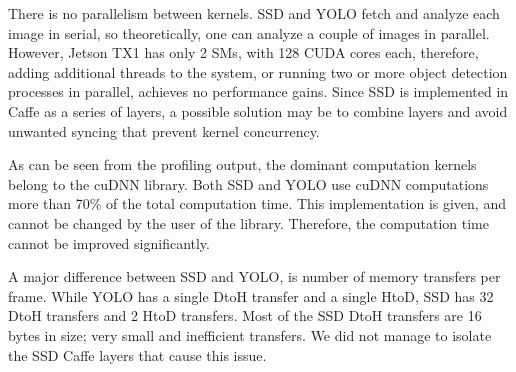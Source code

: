 There is no parallelism between kernels. SSD and YOLO fetch and analyze each image in serial, so theoretically, one can analyze a couple of images in parallel. However, Jetson TX1 has only 2 SMs, with 128 CUDA cores each, therefore, adding additional threads to the system, or running two or more object detection processes in parallel, achieves no performance gains. Since SSD is implemented in Caffe as a series of layers, a possible solution may be to combine layers and avoid unwanted syncing that prevent kernel concurrency.

As can be seen from the profiling output, the dominant computation kernels belong to the cuDNN library. Both SSD and YOLO use cuDNN computations more than 70\% of the total computation time. This implementation is given, and cannot be changed by the user of the library. Therefore, the computation time cannot be improved significantly.

A major difference between SSD and YOLO, is number of memory transfers per frame. While YOLO has a single DtoH transfer and a single HtoD, SSD has 32 DtoH transfers and 2 HtoD transfers. Most of the SSD DtoH transfers are 16 bytes in size; very small and inefficient transfers. We did not manage to isolate the SSD Caffe layers that cause this issue.  



